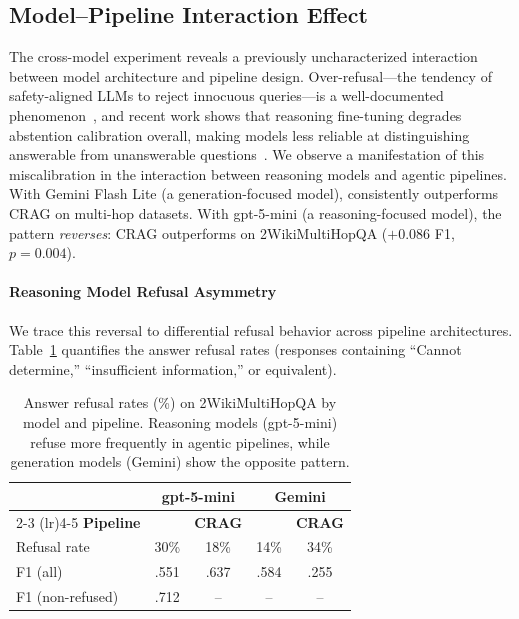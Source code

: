 \subsection{Model--Pipeline Interaction Effect}
\label{subsec:model_interaction}

The cross-model experiment reveals a previously uncharacterized interaction between model architecture and pipeline design.
Over-refusal---the tendency of safety-aligned LLMs to reject innocuous queries---is a well-documented phenomenon~\cite{cui2025orbench,zhang2025falsereject}, and recent work shows that reasoning fine-tuning degrades abstention calibration overall, making models less reliable at distinguishing answerable from unanswerable questions~\cite{kirichenko2025abstentionbench}.
We observe a manifestation of this miscalibration in the interaction between reasoning models and agentic pipelines.
With Gemini Flash Lite (a generation-focused model), \ours{} consistently outperforms CRAG on multi-hop datasets.
With gpt-5-mini (a reasoning-focused model), the pattern \emph{reverses}: CRAG outperforms \ours{} on 2WikiMultiHopQA ($+0.086$ F1, $p = 0.004$).

\paragraph{Reasoning Model Refusal Asymmetry}
We trace this reversal to differential refusal behavior across pipeline architectures.
Table~\ref{tab:refusal} quantifies the answer refusal rates (responses containing ``Cannot determine,'' ``insufficient information,'' or equivalent).

\begin{table}[t]
\centering
\caption{Answer refusal rates (\%) on 2WikiMultiHopQA by model and pipeline. Reasoning models (gpt-5-mini) refuse more frequently in agentic pipelines, while generation models (Gemini) show the opposite pattern.}
\label{tab:refusal}
\begin{tabular}{lcccc}
\toprule
& \multicolumn{2}{c}{\textbf{gpt-5-mini}} & \multicolumn{2}{c}{\textbf{Gemini}} \\
\cmidrule(lr){2-3} \cmidrule(lr){4-5}
\textbf{Pipeline} & \textbf{\ours{}} & \textbf{CRAG} & \textbf{\ours{}} & \textbf{CRAG} \\
\midrule
Refusal rate    & 30\% & 18\% & 14\% & 34\% \\
F1 (all)        & .551 & .637 & .584 & .255 \\
F1 (non-refused) & .712 & -- & -- & -- \\
\bottomrule
\end{tabular}
\end{table}

